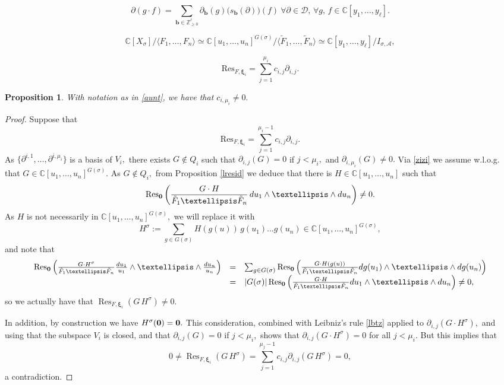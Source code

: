\documentclass[10pt,a4paper]{amsart}
\newtheorem{proposition}{Proposition}
\newcommand{\C}{\mathbb{C}}
\newcommand{\Res}{\operatorname{Res}}
\newcommand{\Z}{\mathbb{Z}}
\newcommand{\bfb}{{\boldsymbol{b}}}
\newcommand{\bfxi}{{\boldsymbol{\xi}}}
\newcommand{\cA}{{\mathcal A}}
\newcommand{\cD}{{\mathcal D}}
\begin{document}
\begin{equation}\label{lbtz}
\partial(g\cdot f)=\sum_{\bfb\in\Z_{\geq0}^\ell} \partial_\bfb(g)\big(s_\bfb(\partial)\big)(f) \ \forall \partial\in\cD,\, \forall g,\,f\in\C[y_1,\ldots, y_\ell].
\end{equation}

\begin{equation}\label{zizi}
\C[X_\sigma]/\langle F_1,\ldots, F_n\rangle\simeq \C[u_1,\ldots, u_n]^{G(\sigma)}/\langle \tilde{F}_1,\ldots, \tilde{F}_n\rangle\simeq \C[y_1,\ldots, y_\ell]/ I_{\sigma,\cA},
\end{equation}

\begin{equation}\label{aunt}
\mbox{Res}_{F,\bfxi_i}=\sum_{j=1}^{\mu_i} c_{i,j}\partial_{i,j}.
\end{equation}

\begin{proposition}\label{neq}
With notation as in \eqref{aunt}, we have that $c_{i,\mu_i}\neq0.$
\end{proposition}

\begin{proof}
Suppose that 
\begin{equation}\label{an}
\mbox{Res}_{F,\bfxi_i}=\sum_{j=1}^{\mu_i-1} c_{i,j}\partial_{i,j}.
\end{equation}
 As $\{\partial^{i,1},\ldots, \partial^{i,\mu_i}\}$ is a basis of $V_i,$ there exists $G\notin Q_i$ such that $\partial_{i,j}(G)=0$ if $j<\mu_i,$ and $\partial_{i,\mu_i}(G)\neq0.$   Via \eqref{zizi} we assume w.l.o.g. that $G\in\C[u_1,\ldots, u_n]^{G(\sigma)}.$ As $G\notin Q_i,$ from Proposition \ref{lresid} we deduce that  there is $H\in\C[u_1,\ldots, u_n]$ such that
\begin{equation}\label{deux}
\Res_{\bf0}\left(\frac{G \cdot H}{\tilde{F}_{1}\ldots \tilde{F}_n}\,d u_1\wedge\ldots\wedge d u_n\right)\neq0.
\end{equation}
As $H$ is not necessarily in $\C[u_1,\ldots, u_n]^{G(\sigma)},$ we will replace it with 
$$H^\sigma:=\sum_{g\in G(\sigma)} H(g(u))\, g(u_1)\ldots g(u_n)\in\C[u_1,\ldots, u_n]^{G(\sigma)},$$ and note that
$$\begin{array}{ccl}
\Res_{\bf0}\left(\frac{G \cdot H^\sigma}{\tilde{F}_{1}\ldots \tilde{F}_n}\frac{d u_1}{u_1}\wedge\ldots\wedge \frac{d u_n}{u_n}\right)& = &
\sum_{g\in G(\sigma)}\Res_{\bf0}\left(\frac{G \cdot H(g(u))}{\tilde{F}_{1}\ldots \tilde{F}_n}d g(u_1)\wedge\ldots\wedge dg( u_n)\right)\\
&=& |G(\sigma)|\Res_{\bf0}\left(\frac{G \cdot H}{\tilde{F}_{1}\ldots \tilde{F}_n}d u_1\wedge\ldots\wedge d u_n\right)\neq0,
\end{array}
$$
so we actually have that $\Res_{F,\bfxi_i}(G\,H^\sigma)\neq0.$ 

In addition, by construction we have $H^\sigma(\bf0)=0.$ 
This consideration, combined with Leibniz's rule \eqref{lbtz} applied to $\partial_{i,j}(G\cdot H^\sigma),$ and using that the subspace $V_i$ is closed,  and that $\partial_{i,j}(G)=0$ if $j<\mu_i,$  shows that 
 $\partial_{i,j}(G\cdot H^\sigma)=0$ for all $j<\mu_i.$ But this implies that 
 $$0\neq \Res_{F,\bfxi_i}(G\,H^\sigma)=\sum_{j=1}^{\mu_j-1}c_{i,j} \partial_{i, j}(G\,H^\sigma)=0,$$ 
a contradiction.
\end{proof}
\end{document}
